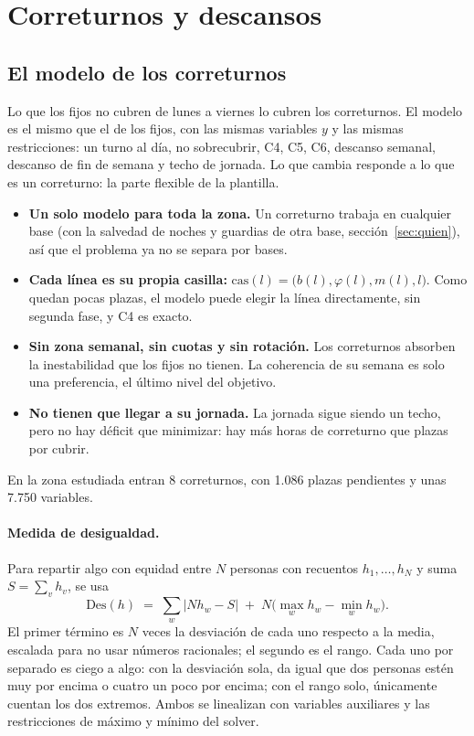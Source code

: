 \documentclass[11pt,a4paper]{article}
\begin{document}
\section{Correturnos y descansos}

\subsection{El modelo de los correturnos}

Lo que los fijos no cubren de lunes a viernes lo cubren los correturnos. El modelo es el mismo
que el de los fijos, con las mismas variables $y$ y las mismas restricciones: un turno al día,
no sobrecubrir, C4, C5, C6, descanso semanal, descanso de fin de semana y techo de jornada. Lo
que cambia responde a lo que es un correturno: la parte flexible de la plantilla.
\begin{itemize}[nosep]
  \item \textbf{Un solo modelo para toda la zona.} Un correturno trabaja en cualquier base (con
        la salvedad de noches y guardias de otra base, sección~\ref{sec:quien}), así que el
        problema ya no se separa por bases.
  \item \textbf{Cada línea es su propia casilla:}
        $\mathrm{cas}(l) = \bigl(b(l), \varphi(l), m(l), l\bigr)$. Como quedan pocas plazas, el
        modelo puede elegir la línea directamente, sin segunda fase, y C4 es exacto.
  \item \textbf{Sin zona semanal, sin cuotas y sin rotación.} Los correturnos absorben la
        inestabilidad que los fijos no tienen. La coherencia de su semana es solo una
        preferencia, el último nivel del objetivo.
  \item \textbf{No tienen que llegar a su jornada.} La jornada sigue siendo un techo, pero no
        hay déficit que minimizar: hay más horas de correturno que plazas por cubrir.
\end{itemize}
En la zona estudiada entran 8 correturnos, con 1.086 plazas pendientes y unas 7.750 variables.

\paragraph{Medida de desigualdad.} Para repartir algo con equidad entre $N$ personas con
recuentos $h_1, \dots, h_N$ y suma $S = \sum_v h_v$, se usa
\[
  \mathrm{Des}(h) \;=\; \sum_{w} \bigl| N h_w - S \bigr| \;+\; N\bigl(\max_w h_w - \min_w h_w\bigr).
\]
El primer término es $N$ veces la desviación de cada uno respecto a la media, escalada para no
usar números racionales; el segundo es el rango. Cada uno por separado es ciego a algo: con la
desviación sola, da igual que dos personas estén muy por encima o cuatro un poco por encima; con
el rango solo, únicamente cuentan los dos extremos. Ambos se linealizan con variables auxiliares
y las restricciones de máximo y mínimo del solver.
\end{document}
